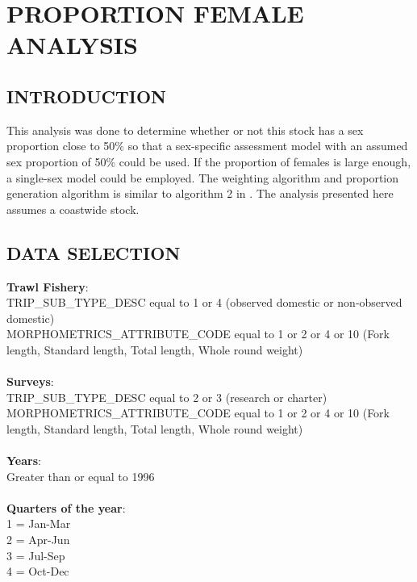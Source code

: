 
\clearpage
\chapter{PROPORTION FEMALE ANALYSIS}
\label{chap:propfemale}

\section{INTRODUCTION}
This analysis was done to determine whether or not this stock has a sex proportion close to 50\% so that a sex-specific assessment model with an assumed sex proportion of 50\% could be used. If the proportion of females is large enough, a single-sex model could be employed. The weighting algorithm and proportion generation algorithm is similar to algorithm 2 in \citet{rocksole2013}. The analysis presented here assumes a coastwide stock.

\section{DATA SELECTION}
\textbf{Trawl Fishery}: \\
TRIP\_SUB\_TYPE\_DESC equal to 1 or 4 (observed domestic or non-observed domestic) \\
MORPHOMETRICS\_ATTRIBUTE\_CODE equal to 1 or 2 or 4 or 10 (Fork length, Standard length, Total length, Whole round weight) \\
\mbox{ }\\

\textbf{Surveys}: \\
TRIP\_SUB\_TYPE\_DESC equal to 2 or 3 (research or charter) \\
MORPHOMETRICS\_ATTRIBUTE\_CODE  equal to 1 or 2 or 4 or 10 (Fork length, Standard length, Total length, Whole round weight) \\
\mbox{ }\\

\textbf{Years}: \\
Greater than or equal to 1996 \\
\mbox{ }\\

\textbf{Quarters of the year}: \\
1 = Jan-Mar \\
2 = Apr-Jun \\
3 = Jul-Sep \\
4 = Oct-Dec \\
\mbox{ }\\

